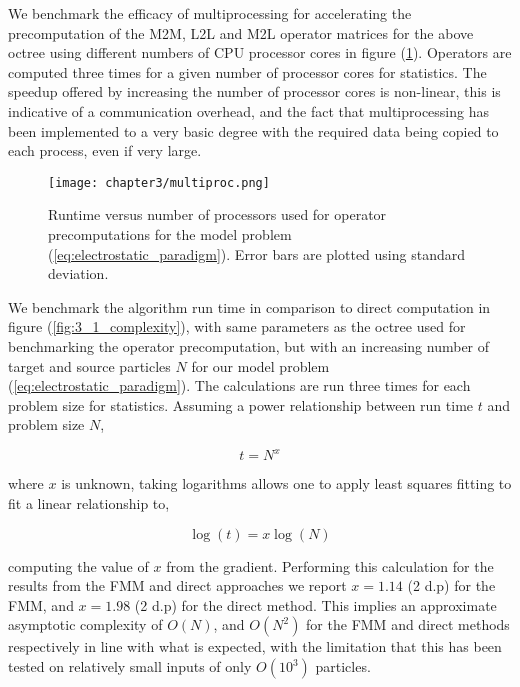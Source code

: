We benchmark the efficacy of multiprocessing for accelerating the precomputation
of the \gls{M2M}, \gls{L2L} and \gls{M2L} operator matrices for the above octree
using different numbers of \gls{CPU} processor cores in figure (\ref{fig:3_1_multiproc}).
Operators are computed three times for a given number of processor cores
for statistics. The speedup offered by increasing the number of processor cores
is non-linear, this is indicative of a communication overhead, and the
fact that multiprocessing has been implemented to a very basic degree with
the required data being copied to each process, even if very large.

\begin{figure}[ht]
    \centering

  {\texttt{[image: chapter3/multiproc.png]}}
  \vspace{0pt}
    \caption{Runtime versus number of processors used for operator precomputations
    for the model problem (\ref{eq:electrostatic_paradigm}). Error bars are
    plotted using standard deviation.
    }
    \label{fig:3_1_multiproc}
\end{figure}

We benchmark the algorithm run time in comparison to direct computation in figure
(\ref{fig:3_1_complexity}), with same parameters as the octree used for benchmarking
the operator precomputation, but with an increasing number of target and source
particles $N$ for our model problem (\ref{eq:electrostatic_paradigm}). The
calculations are run three times for each problem size for statistics.
Assuming a power relationship between run time $t$ and problem size $N$,

\begin{equation}
    t = N^x
\end{equation}

where $x$ is unknown, taking logarithms allows one to apply least squares fitting
to fit a linear relationship to,

\begin{equation}
    \log(t) = x \log(N)
\end{equation}

computing the value of $x$ from the gradient. Performing this calculation for the
results from the \gls{FMM} and direct approaches we report $x=1.14$ (2 d.p) for
the FMM, and $x=1.98$ (2 d.p) for the direct method. This implies an approximate
asymptotic complexity of $O(N)$, and $O(N^2)$ for the \gls{FMM} and direct methods
respectively in line with what is expected, with the limitation that this has
been tested on relatively small inputs of only $O(10^3)$ particles.

